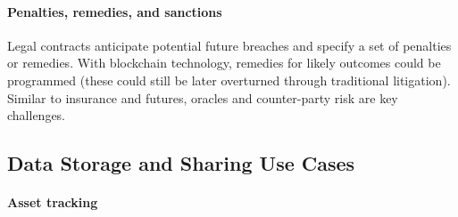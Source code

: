 

\paragraph{Penalties, remedies, and sanctions}


Legal contracts anticipate potential future breaches and specify a set of penalties or remedies. With blockchain technology, remedies for likely outcomes could be programmed (these could still be later overturned through traditional litigation). Similar to insurance and futures, oracles and counter-party risk are key challenges.



\subsection{Data Storage and Sharing Use Cases}

\paragraph{Asset tracking} 

